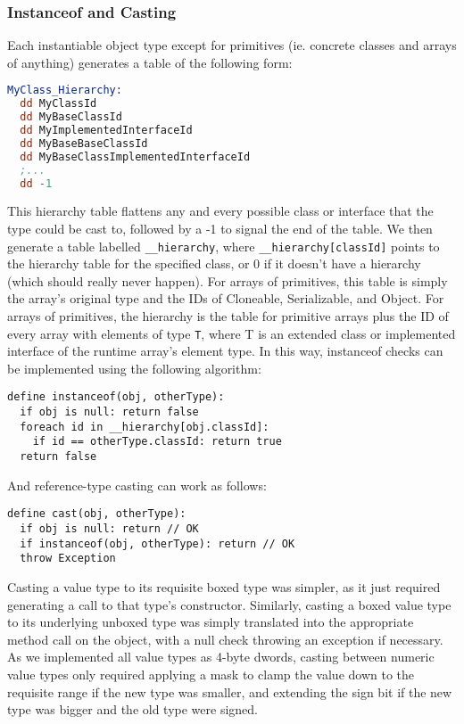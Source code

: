 \documentclass{article}
\begin{document}
\subsubsection{Instanceof and Casting}
Each instantiable object type except for primitives (ie. concrete classes and arrays of anything) generates a table of the following form:
\begin{lstlisting}[language=nasm]
MyClass_Hierarchy:
  dd MyClassId
  dd MyBaseClassId
  dd MyImplementedInterfaceId
  dd MyBaseBaseClassId
  dd MyBaseClassImplementedInterfaceId
  ;...
  dd -1
\end{lstlisting}
This hierarchy table flattens any and every possible class or interface that the type could be cast to, followed by a -1 to signal the end
of the table. We then generate a table labelled \texttt{\_\_hierarchy}, where \texttt{\_\_hierarchy[classId]} points to the hierarchy table
for the specified class, or 0 if it doesn't have a hierarchy (which should really never happen). 
For arrays of primitives, this table is simply the array's original type and the IDs of Cloneable, Serializable, and Object. For arrays of primitives, the hierarchy is the table for primitive arrays plus the ID of every array with elements of type \texttt{T}, where T is an extended class or implemented interface of the runtime array's element type.
In this way, instanceof checks can be implemented
using the following algorithm:
\begin{lstlisting}
define instanceof(obj, otherType):
  if obj is null: return false
  foreach id in __hierarchy[obj.classId]:
    if id == otherType.classId: return true
  return false
\end{lstlisting}
And reference-type casting can work as follows:
\begin{lstlisting}
define cast(obj, otherType):
  if obj is null: return // OK
  if instanceof(obj, otherType): return // OK
  throw Exception
\end{lstlisting}
Casting a value type to its requisite boxed type was simpler, as it just required generating a call to that type's constructor. Similarly,
casting a boxed value type to its underlying unboxed type was simply translated into the appropriate method call on the object, with a null
check throwing an exception if necessary. As we implemented all value types as 4-byte dwords, casting between numeric value types only required
applying a mask to clamp the value down to the requisite range if the new type was smaller, and extending the sign bit if the new type was bigger and
the old type were signed.
\end{document}
